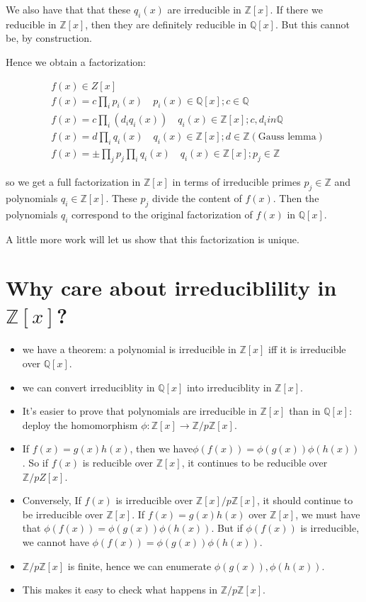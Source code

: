 \documentclass{book}
\newcommand{\Z}{\ensuremath{\mathbb{Z}}}
\newcommand{\Q}{\ensuremath{\mathbb{Q}}}
\theoremstyle{definition}
\begin{document}
We also have that that these $q_i(x)$ are irreducible in $\Z[x]$. If there we
reducible in $\Z[x]$, then they are definitely reducible in $\Q[x]$. But this
cannot be, by construction.


Hence we obtain a factorization:

\begin{align*}
&f(x) \in Z[x] \\
&f(x) = c \prod_i p_i(x) \quad p_i(x) \in \Q[x]; c \in \Q \\
&f(x) = c \prod_i (d_i q_i(x)) \quad q_i(x) \in \Z[x]; c, d_i in \Q \\
&f(x) = d \prod_i q_i(x) \quad q_i(x) \in \Z[x]; d \in \Z (\text{Gauss lemma})\\
&f(x) = \pm \prod_j p_j \prod_i q_i(x) \quad q_i(x) \in \Z[x]; p_j \in \Z 
\end{align*}

so we get a full factorization in $\Z[x]$ in terms of irreducible primes
$p_j \in \Z$ and polynomials $q_i \in \Z[x]$. These $p_j$ divide the content
of $f(x)$. Then the polynomials $q_i$ correspond to the original factorization
of $f(x)$ in $\Q[x]$.

A little more work will let us show that this factorization is unique.

\section{Why care about irreduciblility in $\Z[x]$?}
\begin{itemize}
\item we have a theorem: a polynomial is irreducible in $\Z[x]$ iff it
is irreducible over $\Q[x]$.

\item we can convert irreduciblity in $\Q[x]$ into irreduciblity in $\Z[x]$.
\item It's easier to prove that polynomials are irreducible in $\Z[x]$ than in $\Q[x]$:
    deploy the homomorphism $\phi: \Z[x] \rightarrow \Z/p\Z[x]$.
\item If $f(x) = g(x)h(x)$, then we have$\phi(f(x)) = \phi(g(x)) \phi(h(x))$.
      So if $f(x)$ is reducible over $\Z[x]$, it continues to be reducible
        over $\Z/pZ[x]$.
\item Conversely, If $f(x)$ is irreducible over $\Z[x]/p\Z[x]$, it should continue to be
    irreducible over $\Z[x]$. If $f(x) = g(x) h(x)$ over $\Z[x]$, we must have
        that $\phi(f(x)) = \phi(g(x))\phi(h(x))$. But if $\phi(f(x))$ is irreducible,
        we cannot have $\phi(f(x)) = \phi(g(x)) \phi(h(x))$.
\item $\Z/p\Z[x]$ is finite, hence we can enumerate $\phi(g(x)), \phi(h(x))$.
\item This makes it easy to check what happens in $\Z/p\Z[x]$.
\end{itemize}
\end{document}
